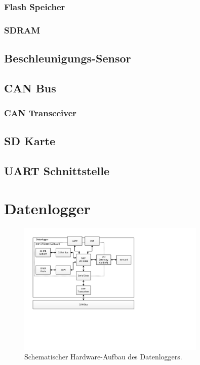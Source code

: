 \subsubsection{Flash Speicher}

\subsubsection{SDRAM}


\subsection{Beschleunigungs-Sensor}

\subsection{CAN Bus}

\subsubsection{CAN Transceiver}


\subsection{SD Karte}

\subsection{UART Schnittstelle}

\section{Datenlogger}

\begin{figure}[H]
	\centering
		\includegraphics[width=0.8\textwidth]{images/visio/hardware_logger.pdf}
	\caption{Schematischer Hardware-Aufbau des Datenloggers.}
	\label{fig.hw_logger}
\end{figure}



